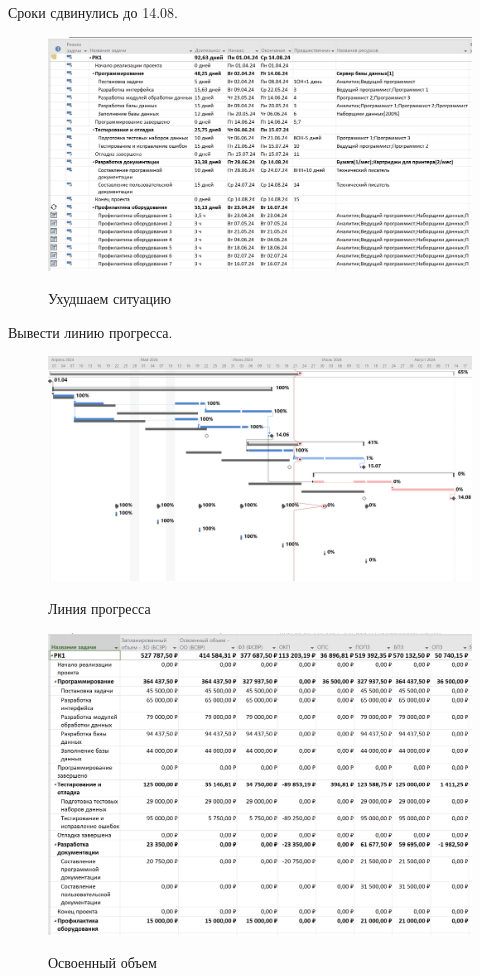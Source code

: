 Сроки сдвинулись до 14.08.

\begin{figure}[ht!]
	\includegraphics[width=0.75\linewidth]{assets/images/10.5.2-pisaka.png}
	\label{fig:r2}
	\caption{Ухудшаем ситуацию}
\end{figure}
\FloatBarrier

Вывести линию прогресса.

\begin{figure}[ht!]
	\includegraphics[width=0.75\linewidth]{assets/images/10.5-progress.png}
	\label{fig:r2}
	\caption{Линия прогресса}
\end{figure}
\FloatBarrier


\begin{figure}[ht!]
	\includegraphics[width=0.75\linewidth]{assets/images/10.6-dengi.png}
	\label{fig:r2}
	\caption{Освоенный объем}
\end{figure}
\FloatBarrier

